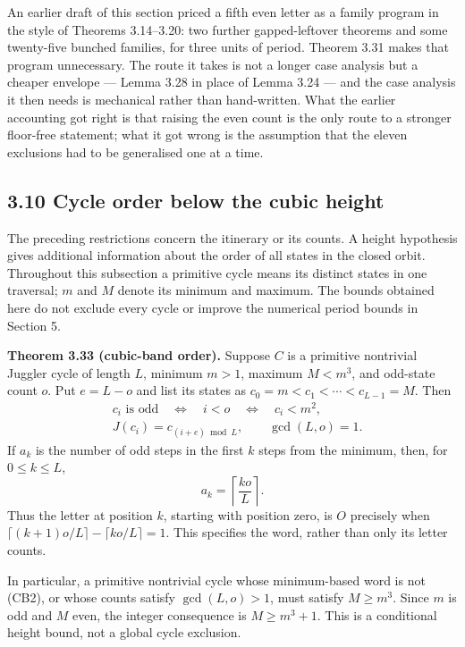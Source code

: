 \documentclass[12pt]{article}
\begin{document}
An earlier draft of this section priced a fifth even letter as a family
program in the style of Theorems 3.14--3.20: two further gapped-leftover
theorems and some twenty-five bunched families, for three units of
period. Theorem 3.31 makes that program unnecessary. The route it takes
is not a longer case analysis but a cheaper envelope --- Lemma 3.28 in
place of Lemma 3.24 --- and the case analysis it then needs is
mechanical rather than hand-written. What the earlier accounting got
right is that raising the even count is the only route to a stronger
floor-free statement; what it got wrong is the assumption that the
eleven exclusions had to be generalised one at a time.

\subsection{3.10 Cycle order below the cubic
height}\label{cycle-order-below-the-cubic-height}

The preceding restrictions concern the itinerary or its counts. A height
hypothesis gives additional information about the order of all states in
the closed orbit. Throughout this subsection a primitive cycle means its
distinct states in one traversal; \(m\) and \(M\) denote its minimum and
maximum. The bounds obtained here do not exclude every cycle or improve
the numerical period bounds in Section 5.

\textbf{Theorem 3.33 (cubic-band order).} Suppose \(C\) is a primitive
nontrivial Juggler cycle of length \(L\), minimum \(m>1\), maximum
\(M<m^3\), and odd-state count \(o\). Put \(e=L-o\) and list its states
as \(c_0=m<c_1<\cdots<c_{L-1}=M\). Then \[
\begin{split}
&c_i\text{ is odd}\quad\Longleftrightarrow\quad i<o
\quad\Longleftrightarrow\quad c_i<m^2,\\
&J(c_i)=c_{(i+e)\bmod L},\qquad \gcd(L,o)=1.
\end{split}\tag{CB1}
\] If \(a_k\) is the number of odd steps in the first \(k\) steps from
the minimum, then, for \(0\le k\le L\), \[
a_k=\left\lceil\frac{ko}{L}\right\rceil.\tag{CB2}
\] Thus the letter at position \(k\), starting with position zero, is
\(O\) precisely when \(\lceil(k+1)o/L\rceil-\lceil ko/L\rceil=1\). This
specifies the word, rather than only its letter counts.

In particular, a primitive nontrivial cycle whose minimum-based word is
not (CB2), or whose counts satisfy \(\gcd(L,o)>1\), must satisfy
\(M\ge m^3\). Since \(m\) is odd and \(M\) even, the integer consequence
is \(M\ge m^3+1\). This is a conditional height bound, not a global
cycle exclusion.
\end{document}

